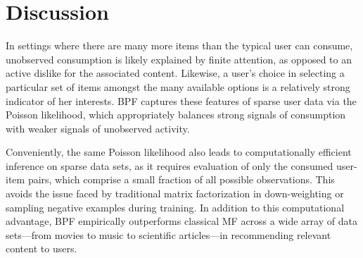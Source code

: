 \section{Discussion}

In settings where there are many more items than the typical user
can consume, unobserved consumption is likely explained by finite
attention, as opposed to an active dislike for the associated
content. Likewise, a user's choice in selecting a particular set of
items amongst the many available options is a relatively strong
indicator of her interests. BPF captures these features of sparse user
data via the Poisson likelihood, which appropriately balances strong
signals of consumption with weaker signals of unobserved activity.



Conveniently, the same Poisson likelihood also leads to
computationally efficient inference on sparse data sets, as it requires
evaluation of only the consumed user-item pairs, which comprise a
small fraction of all possible observations. This avoids the issue
faced by traditional matrix factorization in down-weighting or sampling
negative examples during training. In addition to this computational
advantage, BPF empirically outperforms classical MF across a wide array
of data sets---from movies to music to scientific articles---in
recommending relevant content to users.

